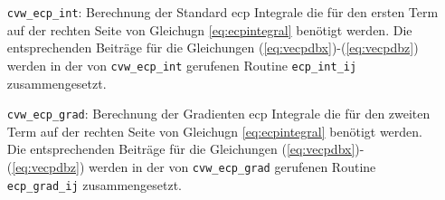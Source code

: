 	\begin{itemize}[leftmargin=77pt]
	\item[\texttt{cvw\_ecp\_int}:] Berechnung der Standard \ac{ecp} Integrale die für den ersten Term auf der rechten Seite von Gleichugn \ref{eq:ecpintegral} benötigt werden. Die entsprechenden Beiträge für die Gleichungen (\ref{eq:vecpdbx})-(\ref{eq:vecpdbz}) werden in der von \texttt{cvw\_ecp\_int} gerufenen Routine \texttt{ecp\_int\_ij} zusammengesetzt.
	\item[\texttt{cvw\_ecp\_grad}:] Berechnung der Gradienten \ac{ecp} Integrale die für den zweiten Term auf der rechten Seite von Gleichugn \ref{eq:ecpintegral} benötigt werden. Die entsprechenden Beiträge für die Gleichungen (\ref{eq:vecpdbx})-(\ref{eq:vecpdbz}) werden in der von \texttt{cvw\_ecp\_grad} gerufenen Routine \texttt{ecp\_grad\_ij} zusammengesetzt.
	\end{itemize} 
	
